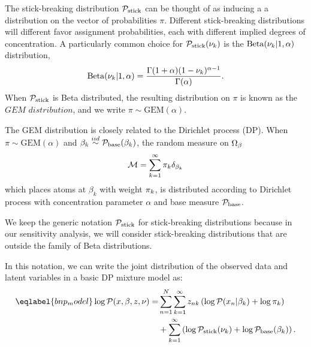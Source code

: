 The stick-breaking distribution $\mathcal{P}_{\mathrm{stick}}$ can be thought of as inducing a
a distribution on the vector of probabilities $\pi$. Different
stick-breaking distributions will different favor assignment probabilities, each
with different implied degrees of concentration.
A particularly common choice for
$\mathcal{P}_{\mathrm{stick}}(\nu_{k})$ is the $\mathrm{Beta}(\nu_{k} \vert 1, \alpha)$ distribution,
%
\begin{align*}
%
\mathrm{Beta}(\nuk \vert 1, \alpha) =
    \frac{\Gamma(1 + \alpha) (1 - \nuk)^{\alpha - 1}}
         {\Gamma(\alpha)}.
%
\end{align*}
%
When $\mathcal{P}_{\mathrm{stick}}$ is Beta distributed, the resulting distribution on $\pi$ is known as the
$\textit{GEM distribution}$, and we write $\pi \sim \mathrm{GEM}(\alpha)$.

The GEM distribution is closely related to the Dirichlet process (DP).
When $\pi \sim \mathrm{GEM}(\alpha)$ and
$\beta_k \overset{iid}{\sim} \mathcal{P}_{\mathrm{base}}(\beta_k)$,
the random measure on $\Omega_{\beta}$
\begin{align*}
  \mathcal{M} = \sum_{k = 1}^\infty \pi_k\delta_{\beta_k}
\end{align*}
which places atoms at $\beta_k$ with weight $\pi_k$,
is distributed according to Dirichlet process with concentration parameter
$\alpha$ and base measure $\mathcal{P}_{\mathrm{base}}$.

We keep the generic notation $\mathcal{P}_{\mathrm{stick}}$ for stick-breaking distributions
because in our sensitivity analysis,
we will consider stick-breaking distributions that are outside the
family of Beta distributions.

In this notation, we can write the joint distribution of
the observed data and latent variables in a basic DP mixture model as:
%
\begin{align}\eqlabel{bnp_model}
%
\logp(\x, \beta, \z, \nu) =&
\sum_{n=1}^N \sum_{k=1}^{\infty}
    \z_{\n\k} \left(
        \logp(\x_n \vert \beta_\k) + \log \pi_\k
    \right)
\nonumber\\
   & +
    \sum_{k=1}^{\infty} \left(
        \log \pstick(\nuk) + \log \pbetaprior(\beta_\k)
    \right).
%
\end{align}
%


